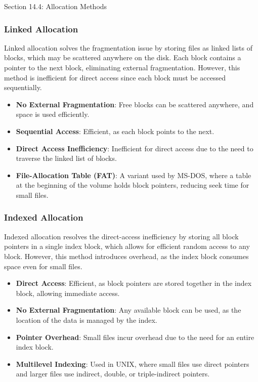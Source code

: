 \begin{notes}{Section 14.4: Allocation Methods}
    \subsubsection*{Linked Allocation}
    
    Linked allocation solves the fragmentation issue by storing files as linked lists of blocks, which may be scattered anywhere on the disk. Each block contains a pointer to the next block, eliminating 
    external fragmentation. However, this method is inefficient for direct access since each block must be accessed sequentially.
    
    \begin{highlight}
    
        \begin{itemize}
            \item \textbf{No External Fragmentation}: Free blocks can be scattered anywhere, and space is used efficiently.
            \item \textbf{Sequential Access}: Efficient, as each block points to the next.
            \item \textbf{Direct Access Inefficiency}: Inefficient for direct access due to the need to traverse the linked list of blocks.
            \item \textbf{File-Allocation Table (FAT)}: A variant used by MS-DOS, where a table at the beginning of the volume holds block pointers, reducing seek time for small files.
        \end{itemize}
    
    \end{highlight}
    
    \subsubsection*{Indexed Allocation}
    
    Indexed allocation resolves the direct-access inefficiency by storing all block pointers in a single index block, which allows for efficient random access to any block. However, this method introduces 
    overhead, as the index block consumes space even for small files.
    
    \begin{highlight}
    
        \begin{itemize}
            \item \textbf{Direct Access}: Efficient, as block pointers are stored together in the index block, allowing immediate access.
            \item \textbf{No External Fragmentation}: Any available block can be used, as the location of the data is managed by the index.
            \item \textbf{Pointer Overhead}: Small files incur overhead due to the need for an entire index block.
            \item \textbf{Multilevel Indexing}: Used in UNIX, where small files use direct pointers and larger files use indirect, double, or triple-indirect pointers.
        \end{itemize}
    

\end{highlight}
\end{notes}
